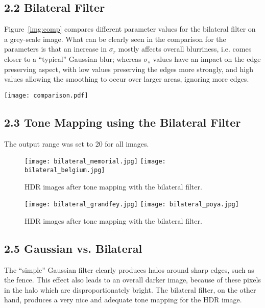 \documentclass[11pt,a4paper]{article}
\begin{document}
\subsection*{2.2 Bilateral Filter}
Figure~\ref{img:comp} compares different parameter values for the bilateral filter on a grey-scale image. What can be clearly seen in the comparison for the parameters is that an increase in $\sigma_r$ mostly affects overall blurriness, i.e. comes closer to a ``typical'' Gaussian blur; whereas $\sigma_s$ values have an impact on the edge preserving aspect, with low values preserving the edges more strongly, and high values allowing the smoothing to occur over larger areas, ignoring more edges.
\begin{sidewaysfigure}[hp]
    \begin{center}
        \texttt{[image: comparison.pdf]}
        \caption{Comparison of different parameters for $\sigma_s$ and $\sigma_r$, inspired by the lecture slides.\label{img:comp}}
    \end{center}
\end{sidewaysfigure}

\newpage
\FloatBarrier
\subsection*{2.3 Tone Mapping using the Bilateral Filter}
The output range was set to 20 for all images.

\begin{figure}[htb]
    \begin{center}
        \texttt{[image: bilateral\_memorial.jpg]}
        \texttt{[image: bilateral\_belgium.jpg]}
        \caption{HDR images after tone mapping with the bilateral filter.}
    \end{center}
\end{figure}

\begin{figure}[htb]
    \begin{center}
        \texttt{[image: bilateral\_grandfey.jpg]}
         \texttt{[image: bilateral\_poya.jpg]}
        \caption{HDR images after tone mapping with the bilateral filter.}
    \end{center}
\end{figure}

\newpage
\FloatBarrier
\subsection*{2.5 Gaussian vs. Bilateral}
The ``simple'' Gaussian filter clearly produces halos around sharp edges, such as the fence. This effect also leads to an overall darker image, because of these pixels in the halo which are disproportionately bright. The bilateral filter, on the other hand, produces a very nice and adequate tone mapping for the HDR image.
\end{document}
